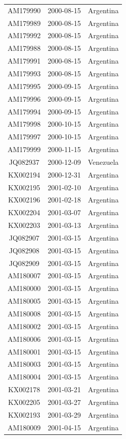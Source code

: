 \documentclass[a4paper,10pt]{article}
\begin{document}
\begin{center}
\begin{longtable}{ccc}
AM179990 & 2000-08-15 & Argentina \\
AM179989 & 2000-08-15 & Argentina \\
AM179992 & 2000-08-15 & Argentina \\
AM179988 & 2000-08-15 & Argentina \\
AM179991 & 2000-08-15 & Argentina \\
AM179993 & 2000-08-15 & Argentina \\
AM179995 & 2000-09-15 & Argentina \\
AM179996 & 2000-09-15 & Argentina \\
AM179994 & 2000-09-15 & Argentina \\
AM179998 & 2000-10-15 & Argentina \\
AM179997 & 2000-10-15 & Argentina \\
AM179999 & 2000-11-15 & Argentina \\
JQ082937 & 2000-12-09 & Venezuela \\
KX002194 & 2000-12-31 & Argentina \\
KX002195 & 2001-02-10 & Argentina \\
KX002196 & 2001-02-18 & Argentina \\
KX002204 & 2001-03-07 & Argentina \\
KX002203 & 2001-03-13 & Argentina \\
JQ082907 & 2001-03-15 & Argentina \\
JQ082908 & 2001-03-15 & Argentina \\
JQ082909 & 2001-03-15 & Argentina \\
AM180007 & 2001-03-15 & Argentina \\
AM180000 & 2001-03-15 & Argentina \\
AM180005 & 2001-03-15 & Argentina \\
AM180008 & 2001-03-15 & Argentina \\
AM180002 & 2001-03-15 & Argentina \\
AM180006 & 2001-03-15 & Argentina \\
AM180001 & 2001-03-15 & Argentina \\
AM180003 & 2001-03-15 & Argentina \\
AM180004 & 2001-03-15 & Argentina \\
KX002178 & 2001-03-21 & Argentina \\
KX002205 & 2001-03-27 & Argentina \\
KX002193 & 2001-03-29 & Argentina \\
AM180009 & 2001-04-15 & Argentina \\

\end{longtable}
\end{center}
\end{document}
